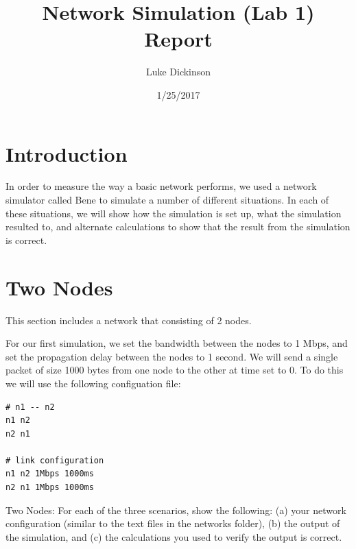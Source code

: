 \documentclass[fleqn,11pt]{article}
\begin{document}
\lstset{
  language=Python,
  basicstyle=\small,          %
  keywordstyle=\bfseries,
  identifierstyle=,           %
  commentstyle=,              %
  stringstyle=\ttfamily,      %
  showstringspaces=false,     %
  numbers=left,
  numberstyle=\tiny,
  numbersep=5pt,
  frame=tb,
}

\title{Network Simulation (Lab 1) Report}

\author{Luke Dickinson}

\date{1/25/2017}

\maketitle

\section{Introduction}

In order to measure the way a basic network performs, we used a network simulator called Bene to simulate a number of different situations. In each of these situations, we will show how the simulation is set up, what the simulation resulted to, and alternate calculations to show that the result from the simulation is correct.

\section{Two Nodes}
This section includes a network that consisting of 2 nodes.


For our first simulation, we set the bandwidth between the nodes to 1 Mbps, and set the propagation delay between the nodes to 1 second. We will send a single packet of size 1000 bytes from one node to the other at time set to 0. To do this we will use the following configuation file:

\begin{lstlisting}
# n1 -- n2
n1 n2
n2 n1

# link configuration
n1 n2 1Mbps 1000ms
n2 n1 1Mbps 1000ms
\end{lstlisting}



Two Nodes: For each of the three scenarios, show the following: (a) your network configuration (similar to the text files in the networks folder), (b) the output of the simulation, and (c) the calculations you used to verify the output is correct.
\end{document}
